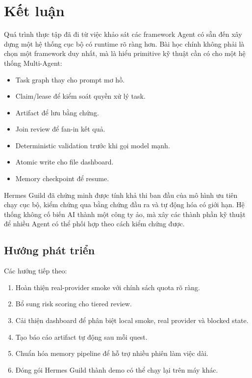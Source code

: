 \documentclass[12pt,a4paper]{article}
\begin{document}
\section{Kết luận}

Quá trình thực tập đã đi từ việc khảo sát các framework Agent có sẵn đến xây dựng một hệ thống cục bộ có runtime rõ ràng hơn. Bài học chính không phải là chọn một framework duy nhất, mà là hiểu primitive kỹ thuật cần có cho một hệ thống Multi-Agent:

\begin{itemize}
    \item Task graph thay cho prompt mơ hồ.
    \item Claim/lease để kiểm soát quyền xử lý task.
    \item Artifact để lưu bằng chứng.
    \item Join review để fan-in kết quả.
    \item Deterministic validation trước khi gọi model mạnh.
    \item Atomic write cho file dashboard.
    \item Memory checkpoint để resume.
\end{itemize}

Hermes Guild đã chứng minh được tính khả thi ban đầu của mô hình ưu tiên chạy cục bộ, kiểm chứng qua bằng chứng đầu ra và tự động hóa có giới hạn. Hệ thống không cố biến AI thành một công ty ảo, mà xây các thành phần kỹ thuật để nhiều Agent có thể phối hợp theo cách kiểm chứng được.

\subsection{Hướng phát triển}

Các hướng tiếp theo:

\begin{enumerate}
    \item Hoàn thiện real-provider smoke với chính sách quota rõ ràng.
    \item Bổ sung risk scoring cho tiered review.
    \item Cải thiện dashboard để phân biệt local smoke, real provider và blocked state.
    \item Tạo báo cáo artifact tự động sau mỗi quest.
    \item Chuẩn hóa memory pipeline để hỗ trợ nhiều phiên làm việc dài.
    \item Đóng gói Hermes Guild thành demo có thể chạy lại trên máy khác.
\end{enumerate}
\end{document}

